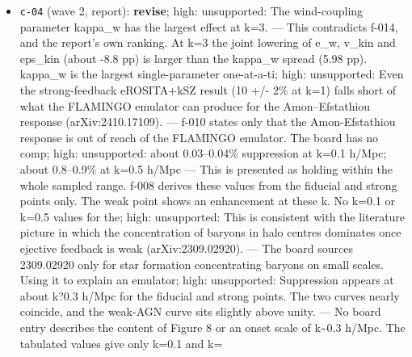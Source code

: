 \documentclass[11pt,a4paper]{article}
\begin{document}
\begin{itemize}
  \item \texttt{c-04} (wave 2, report): \textbf{revise}; high: unsupported: The wind-coupling parameter kappa\_w has the largest effect at k=3. --- This contradicts f-014, and the report's own ranking. At k=3 the joint lowering of e\_w, v\_kin and eps\_kin (about -8.8 pp) is larger than the kappa\_w spread (5.98 pp). kappa\_w is the largest single-parameter one-at-a-ti; high: unsupported: Even the strong-feedback eROSITA+kSZ result (10 +/- 2\% at k=1) falls short of what the FLAMINGO emulator can produce for the Amon--Efstathiou response (arXiv:2410.17109). --- f-010 states only that the Amon-Efstathiou response is out of reach of the FLAMINGO emulator. The board has no comp; high: unsupported: about 0.03--0.04\% suppression at k=0.1 h/Mpc; about 0.8--0.9\% at k=0.5 h/Mpc --- This is presented as holding within the whole sampled range. f-008 derives these values from the fiducial and strong points only. The weak point shows an enhancement at these k. No k=0.1 or k=0.5 values for the; high: unsupported: This is consistent with the literature picture in which the concentration of baryons in halo centres dominates once ejective feedback is weak (arXiv:2309.02920). --- The board sources 2309.02920 only for star formation concentrating baryons on small scales. Using it to explain an emulator; high: unsupported: Suppression appears at about k?0.3 h/Mpc for the fiducial and strong points. The two curves nearly coincide, and the weak-AGN curve sits slightly above unity. --- No board entry describes the content of Figure 8 or an onset scale of k\textasciitilde{}0.3 h/Mpc. The tabulated values give only k=0.1 and k=
\end{itemize}
\end{document}

